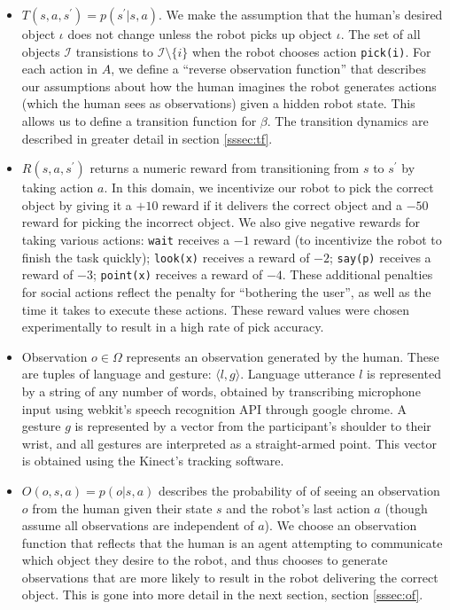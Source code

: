 \documentclass[conference]{IEEEtran}
\newcommand{\Iota}{\mathcal{I}}
\begin{document}
\begin{itemize}
	\item $T(s, a, s^\prime) = p(s^\prime | s, a)$. We make the assumption that the human's desired object $\iota$ does not change unless the robot picks up object $\iota$. The set of all objects $\Iota$ transistions to $\Iota \setminus \{i\}$ when the robot chooses action \texttt{pick(i)}. For each action in $A$, we define a ``reverse observation function'' that describes our assumptions about how the human imagines the robot generates actions (which the human sees as observations) given a hidden robot state. This allows us to define a transition function for $\beta$. The transition dynamics are described in greater detail in section  \ref{sssec:tf}. 
	\item $R(s, a, s^\prime)$ returns a numeric reward from transitioning from $s$ to $s^\prime$ by taking action $a$. In this domain, we incentivize our robot to pick the correct object by giving it a $+10$ reward if it delivers the correct object and a $-50$ reward for picking the incorrect object. We also give negative rewards for taking various actions: \texttt{wait} receives a $-1$ reward (to incentivize the robot to finish the task quickly); \texttt{look(x)} receives a reward of $-2$; \texttt{say(p)} receives a reward of $-3$; \texttt{point(x)}  receives a reward of $-4$. These additional penalties for social actions reflect the penalty for ``bothering the user'', as well as the time it takes to execute these actions. These reward values were chosen experimentally to result in a high rate of pick accuracy. 
	\item Observation $o \in \Omega$ represents an observation generated by the human. These are tuples of language and gesture: $\langle l, g \rangle$. Language utterance $l$ is represented by a string of any number of words, obtained by transcribing microphone input using webkit's speech recognition API through google chrome.  A gesture $g$ is represented by a vector from the participant's shoulder to their wrist, and all gestures are interpreted as a straight-armed point. This vector is obtained using the Kinect's tracking software. 
	\item $O(o, s, a) = p(o |s, a)$ describes the probability of of seeing an observation $o$ from the human given their state $s$ and the robot's last action $a$ (though assume all observations are independent of $a$). We choose an observation function that reflects that the human is an agent attempting to communicate which object they desire to the robot, and thus chooses to generate observations that are more likely to result in the robot delivering the correct object. This is gone into more detail in the next section, section \ref{sssec:of}. 
\end{itemize}
\end{document}
